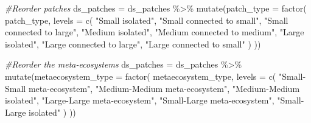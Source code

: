 \documentclass[
]{article}
\newenvironment{Shaded}{\begin{snugshade}}{\end{snugshade}}
\newcommand{\AttributeTok}[1]{\textcolor[rgb]{0.77,0.63,0.00}{#1}}
\newcommand{\CommentTok}[1]{\textcolor[rgb]{0.56,0.35,0.01}{\textit{#1}}}
\newcommand{\FunctionTok}[1]{\textcolor[rgb]{0.00,0.00,0.00}{#1}}
\newcommand{\NormalTok}[1]{#1}
\newcommand{\OtherTok}[1]{\textcolor[rgb]{0.56,0.35,0.01}{#1}}
\newcommand{\SpecialCharTok}[1]{\textcolor[rgb]{0.00,0.00,0.00}{#1}}
\newcommand{\StringTok}[1]{\textcolor[rgb]{0.31,0.60,0.02}{#1}}
\begin{document}
\begin{Shaded}
\begin{Highlighting}[]
\CommentTok{\#Reorder patches}
\NormalTok{ds\_patches }\OtherTok{=}\NormalTok{ ds\_patches }\SpecialCharTok{\%\textgreater{}\%}
  \FunctionTok{mutate}\NormalTok{(}\AttributeTok{patch\_type =} \FunctionTok{factor}\NormalTok{(}
\NormalTok{    patch\_type,}
    \AttributeTok{levels =} \FunctionTok{c}\NormalTok{(}
      \StringTok{"Small isolated"}\NormalTok{,}
      \StringTok{"Small connected to small"}\NormalTok{,}
      \StringTok{"Small connected to large"}\NormalTok{,}
      \StringTok{"Medium isolated"}\NormalTok{,}
      \StringTok{"Medium connected to medium"}\NormalTok{,}
      \StringTok{"Large isolated"}\NormalTok{,}
      \StringTok{"Large connected to large"}\NormalTok{,}
      \StringTok{"Large connected to small"}
\NormalTok{    )}
\NormalTok{  ))}

\CommentTok{\#Reorder the meta{-}ecosystems}
\NormalTok{ds\_patches }\OtherTok{=}\NormalTok{ ds\_patches }\SpecialCharTok{\%\textgreater{}\%}
  \FunctionTok{mutate}\NormalTok{(}\AttributeTok{metaecosystem\_type =} \FunctionTok{factor}\NormalTok{(}
\NormalTok{    metaecosystem\_type,}
    \AttributeTok{levels =} \FunctionTok{c}\NormalTok{(}
      \StringTok{"Small{-}Small meta{-}ecosystem"}\NormalTok{,}
      \StringTok{"Medium{-}Medium meta{-}ecosystem"}\NormalTok{,}
      \StringTok{"Medium{-}Medium isolated"}\NormalTok{,}
      \StringTok{"Large{-}Large meta{-}ecosystem"}\NormalTok{,}
      \StringTok{"Small{-}Large meta{-}ecosystem"}\NormalTok{,}
      \StringTok{"Small{-}Large isolated"}
\NormalTok{    )}
\NormalTok{  ))}
\end{Highlighting}
\end{Shaded}
\end{document}
